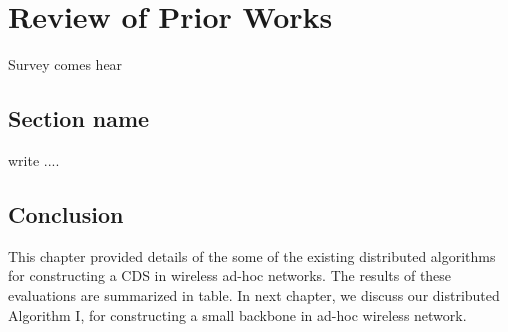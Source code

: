 \chapter{Review of Prior Works}

Survey comes hear

\section{Section name}

write ....

\section{Conclusion}

This chapter provided details of the some of the existing
distributed algorithms for constructing a CDS in wireless ad-hoc
networks. The results of these evaluations are summarized in table. In next chapter, we discuss our distributed
Algorithm I, for constructing a small backbone in ad-hoc wireless
network.
